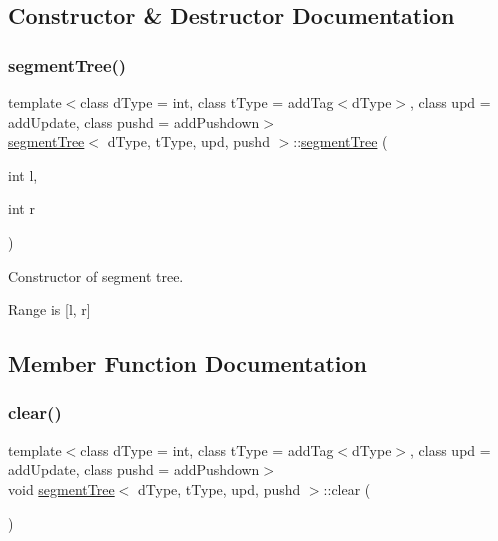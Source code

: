 \subsection{Constructor \& Destructor Documentation}
\mbox{\label{classsegment_tree_ab4520ca7991d68d7c2507c54b030b0f9}} 
\subsubsection{\texorpdfstring{segment\+Tree()}{segmentTree()}}
{\footnotesize\ttfamily template$<$class d\+Type  = int, class t\+Type  = add\+Tag$<$d\+Type$>$, class upd  = add\+Update, class pushd  = add\+Pushdown$>$ \\
\mbox{\hyperlink{classsegment_tree}{segment\+Tree}}$<$ d\+Type, t\+Type, upd, pushd $>$\+::\mbox{\hyperlink{classsegment_tree}{segment\+Tree}} (\begin{DoxyParamCaption}\item[{int}]{l,  }\item[{int}]{r }\end{DoxyParamCaption})\hspace{0.3cm}{\ttfamily [inline]}}



Constructor of segment tree. 

Range is \mbox{[}l, r\mbox{]} 

\subsection{Member Function Documentation}
\mbox{\label{classsegment_tree_a39aaff1b005ca0487cda0943ed295536}} 
\subsubsection{\texorpdfstring{clear()}{clear()}}
{\footnotesize\ttfamily template$<$class d\+Type  = int, class t\+Type  = add\+Tag$<$d\+Type$>$, class upd  = add\+Update, class pushd  = add\+Pushdown$>$ \\
void \mbox{\hyperlink{classsegment_tree}{segment\+Tree}}$<$ d\+Type, t\+Type, upd, pushd $>$\+::clear (\begin{DoxyParamCaption}{ }\end{DoxyParamCaption})\hspace{0.3cm}{\ttfamily [inline]}}



